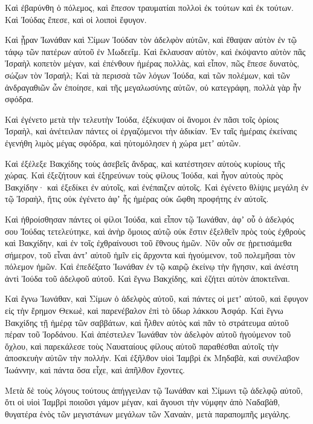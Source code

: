 {Καὶ ἐβαρύνθη ὁ πόλεμος, καὶ ἔπεσον τραυματίαι πολλοὶ ἐκ τούτων καὶ ἐκ τούτων.
Καὶ Ἰούδας ἔπεσε, καὶ οἱ λοιποὶ ἔφυγον.
\par }{\PP {}Καὶ ᾖραν Ἰωνάθαν καὶ Σίμων Ἰούδαν τὸν ἀδελφὸν αὐτῶν, καὶ ἔθαψαν αὐτὸν ἐν τῷ τάφῳ τῶν πατέρων αὐτοῦ ἐν Μωδεεΐμ.
Καὶ ἔκλαυσαν αὐτὸν, καὶ ἐκόψαντο αὐτὸν πᾶς Ἰσραὴλ κοπετὸν μέγαν, καὶ ἐπένθουν ἡμέρας πολλὰς, καὶ εἶπον,
πῶς ἔπεσε δυνατὸς, σώζων τὸν Ἰσραήλ;
Καὶ τὰ περισσὰ τῶν λόγων Ἰούδα, καὶ τῶν πολέμων, καὶ τῶν ἀνδραγαθιῶν ὧν ἐποίησε, καὶ τῆς μεγαλωσύνης αὐτῶν, οὐ κατεγράφη, πολλὰ γὰρ ἦν σφόδρα.
\par }{\PP {}Καὶ ἐγένετο μετὰ τὴν τελευτὴν Ἰούδα, ἐξέκυψαν οἱ ἄνομοι ἐν πᾶσι τοῖς ὁρίοις Ἰσραὴλ, καὶ ἀνέτειλαν πάντες οἱ ἐργαζόμενοι τὴν ἀδικίαν.
Ἐν ταῖς ἡμέραις ἐκείναις ἐγενήθη λιμὸς μέγας σφόδρα, καὶ ηὐτομόλησεν ἡ χώρα μετʼ αὐτῶν.
\par }{\PP {}Καὶ ἐξέλεξε Βακχίδης τοὺς ἀσεβεῖς ἄνδρας, καὶ κατέστησεν αὐτοὺς κυρίους τῆς χώρας.
Καὶ ἐξεζήτουν καὶ ἐξηρεύνων τοὺς φίλους Ἰούδα, καὶ ἦγον αὐτοὺς πρὸς Βακχίδην· καὶ ἐξεδίκει ἐν αὐτοῖς, καὶ ἐνέπαιζεν αὐτοῖς.
Καὶ ἐγένετο θλίψις μεγάλη ἐν τῷ Ἰσραὴλ, ἥτις οὐκ ἐγένετο ἀφʼ ἧς ἡμέρας οὐκ ὤφθη προφήτης ἐν αὐτοῖς.
\par }{\PP {}Καὶ ἠθροίσθησαν πάντες οἱ φίλοι Ἱούδα, καὶ εἶπον τῷ Ἰωνάθαν,
ἀφʼ οὗ ὁ ἀδελφός σου Ἰούδας τετελεύτηκε, καὶ ἀνὴρ ὅμοιος αὐτῷ οὐκ ἔστιν ἐξελθεῖν πρὸς τοὺς ἐχθροὺς καὶ Βακχίδην, καὶ ἐν τοῖς ἐχθραίνουσι τοῦ ἔθνους ἡμῶν.
Νῦν οὖν σε ᾑρετισάμεθα σήμερον, τοῦ εἶναι ἀντʼ αὐτοῦ ἡμῖν εἰς ἄρχοντα καὶ ἡγούμενον, τοῦ πολεμῆσαι τὸν πόλεμον ἡμῶν.
Καὶ ἐπεδέξατο Ἰωνάθαν ἐν τῷ καιρῷ ἐκείνῳ τὴν ἥγησιν, καὶ ἀνέστη ἀντὶ Ἰούδα τοῦ ἀδελφοῦ αὐτοῦ.
Καὶ ἔγνω Βακχίδης, καὶ ἐζήτει αὐτὸν ἀποκτεῖναι.
\par }{\PP {}Καὶ ἔγνω Ἰωνάθαν, καὶ Σίμων ὁ ἀδελφὸς αὐτοῦ, καὶ πάντες οἱ μετʼ αὐτοῦ, καὶ ἔφυγον εἰς τὴν ἔρημον Θεκωὲ, καὶ παρενέβαλον ἐπὶ τὸ ὕδωρ λάκκου Ἀσφάρ.
Καὶ ἔγνω Βακχίδης τῇ ἡμέρᾳ τῶν σαββάτων, καὶ ἦλθεν αὐτὸς καὶ πᾶν τὸ στράτευμα αὐτοῦ πέραν τοῦ Ἰορδάνου.
Καὶ ἀπέστειλεν Ἰωνάθαν τὸν ἀδελφὸν αὐτοῦ ἡγούμενον τοῦ ὄχλου, καὶ παρεκάλεσε τοὺς Ναυαταίους φίλους αὐτοῦ παραθέσθαι αὐτοῖς τὴν ἀποσκευὴν αὐτῶν τὴν πολλήν.
Καὶ ἐξῆλθον υἱοὶ Ἰαμβρὶ ἐκ Μηδαβὰ, καὶ συνέλαβον Ἰωάννην, καὶ πάντα ὅσα εἶχε, καὶ ἀπῆλθον ἔχοντες.
\par }{\PP {}Μετὰ δὲ τοὺς λόγους τούτους ἀπήγγειλαν τῷ Ἰωνάθαν καὶ Σίμωνι τῷ ἀδελφῷ αὐτοῦ, ὅτι οἱ υἱοὶ Ἰαμβρὶ ποιοῦσι γάμον μέγαν, καὶ ἄγουσι τὴν νύμφην ἀπὸ Ναδαβὰθ, θυγατέρα ἑνὸς τῶν μεγιστάνων μεγάλων τῶν Χαναὰν, μετὰ παραπομπῆς μεγάλης.
}

